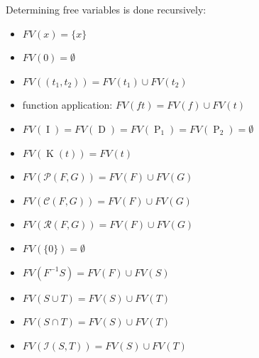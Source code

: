 \begin{node}
Determining free variables is done recursively:
\begin{itemize}
\item $FV(x)=\{x\}$
\item $FV(0)=\emptyset$
\item $FV((t_{1},t_{2}))=FV(t_{1})\cup FV(t_{2})$
\item function application: $FV(ft)=FV(f)\cup FV(t)$
\item $FV(\operatorname{I})=FV(\operatorname{D})=FV(\operatorname{P}_{1})=FV(\operatorname{P}_{2})=\emptyset$
\item $FV(\operatorname{K}(t))=FV(t)$
\item $FV(\mathcal{P}(F,G))=FV(F)\cup FV(G)$
\item $FV(\mathcal{C}(F,G))=FV(F)\cup FV(G)$
\item $FV(\mathcal{R}(F,G))=FV(F)\cup FV(G)$
\item $FV(\{0\})=\emptyset$
\item $FV(F^{-1}S)=FV(F)\cup FV(S)$
\item $FV(S\cup T)=FV(S)\cup FV(T)$
\item $FV(S\cap T)=FV(S)\cup FV(T)$
\item $FV(\mathcal{I}(S, T))=FV(S)\cup FV(T)$
\end{itemize}
\end{node}

